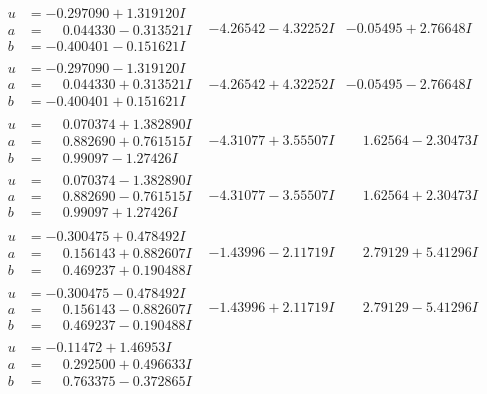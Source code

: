 \documentclass[1p]{elsarticle_modified}
\theoremstyle{definition}
\begin{document}
$$\begin{array}{c|c|c}
\begin{aligned}
u &= -0.297090 + 1.319120 I \\
a &= \phantom{-}0.044330 - 0.313521 I \\
b &= -0.400401 - 0.151621 I\end{aligned}
 & -4.26542 - 4.32252 I & -0.05495 + 2.76648 I \\ \hline\begin{aligned}
u &= -0.297090 - 1.319120 I \\
a &= \phantom{-}0.044330 + 0.313521 I \\
b &= -0.400401 + 0.151621 I\end{aligned}
 & -4.26542 + 4.32252 I & -0.05495 - 2.76648 I \\ \hline\begin{aligned}
u &= \phantom{-}0.070374 + 1.382890 I \\
a &= \phantom{-}0.882690 + 0.761515 I \\
b &= \phantom{-}0.99097 - 1.27426 I\end{aligned}
 & -4.31077 + 3.55507 I & \phantom{-}1.62564 - 2.30473 I \\ \hline\begin{aligned}
u &= \phantom{-}0.070374 - 1.382890 I \\
a &= \phantom{-}0.882690 - 0.761515 I \\
b &= \phantom{-}0.99097 + 1.27426 I\end{aligned}
 & -4.31077 - 3.55507 I & \phantom{-}1.62564 + 2.30473 I \\ \hline\begin{aligned}
u &= -0.300475 + 0.478492 I \\
a &= \phantom{-}0.156143 + 0.882607 I \\
b &= \phantom{-}0.469237 + 0.190488 I\end{aligned}
 & -1.43996 - 2.11719 I & \phantom{-}2.79129 + 5.41296 I \\ \hline\begin{aligned}
u &= -0.300475 - 0.478492 I \\
a &= \phantom{-}0.156143 - 0.882607 I \\
b &= \phantom{-}0.469237 - 0.190488 I\end{aligned}
 & -1.43996 + 2.11719 I & \phantom{-}2.79129 - 5.41296 I \\ \hline\begin{aligned}
u &= -0.11472 + 1.46953 I \\
a &= \phantom{-}0.292500 + 0.496633 I \\
b &= \phantom{-}0.763375 - 0.372865 I\end{aligned}

\end{array}$$
\end{document}
